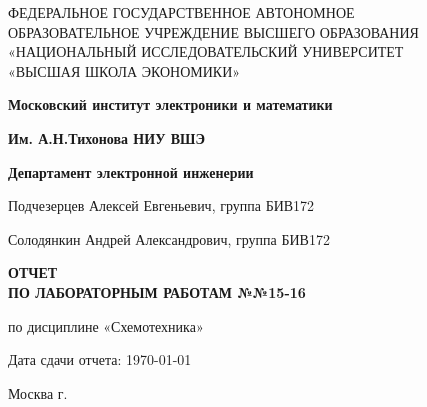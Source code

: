 \begin{titlepage}
	\begin{center}
		ФЕДЕРАЛЬНОЕ  ГОСУДАРСТВЕННОЕ АВТОНОМНОЕ \\
		ОБРАЗОВАТЕЛЬНОЕ УЧРЕЖДЕНИЕ ВЫСШЕГО ОБРАЗОВАНИЯ\\
		«НАЦИОНАЛЬНЫЙ ИССЛЕДОВАТЕЛЬСКИЙ УНИВЕРСИТЕТ\\
		«ВЫСШАЯ ШКОЛА ЭКОНОМИКИ»
	\end{center}
	
	\begin{center}
		\textbf{Московский институт электроники и математики}
		
		\textbf{Им. А.Н.Тихонова НИУ ВШЭ}
		
		\textbf{Департамент электронной инженерии}
	\end{center}
	\vspace{1ex}	
	\begin{center}
		Подчезерцев Алексей Евгеньевич, группа БИВ172
		
		Солодянкин Андрей Александрович, группа БИВ172
	\end{center}	
	\vspace{1ex}
	\begin{center}
		\textbf{ОТЧЕТ\\
		ПО ЛАБОРАТОРНЫМ РАБОТАМ №№15-16
	}
	\end{center}	
	\vspace{2ex}
	\begin{center}
		по дисциплине «Схемотехника»
	\end{center}
	\vspace{2ex}
	\begin{center}
	Дата сдачи отчета: \today
	\end{center}
	\vspace{2ex}
	\vfill
	\begin{center}
		Москва \the\year г.
	\end{center}
\end{titlepage}